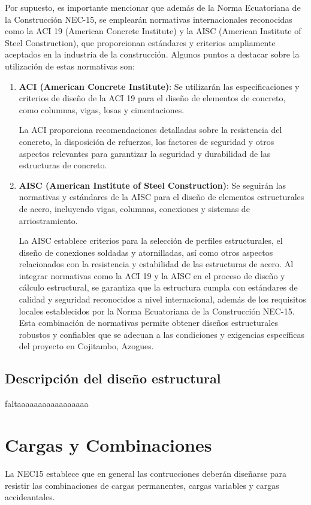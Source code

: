 \documentclass{report}
\begin{document}
Por supuesto, es importante mencionar que además de la Norma Ecuatoriana de la Construcción NEC-15, se emplearán normativas internacionales reconocidas como la ACI 19 (American Concrete Institute) y la AISC (American Institute of Steel Construction), que proporcionan estándares y criterios ampliamente aceptados en la industria de la construcción. Algunos puntos a destacar sobre la utilización de estas normativas son:
\begin{enumerate}
    \item  \textbf{ACI (American Concrete Institute)}: Se utilizarán las especificaciones y criterios de diseño de la ACI 19 para el diseño de elementos de concreto, como columnas, vigas, losas y cimentaciones. 
    
    La ACI  proporciona recomendaciones detalladas sobre la resistencia del concreto, la disposición de refuerzos, los factores de seguridad y otros aspectos relevantes para garantizar la seguridad y durabilidad de las estructuras de concreto.
    
    \item \textbf{AISC (American Institute of Steel Construction)}: Se seguirán las normativas y estándares de la AISC para el diseño de elementos estructurales de acero, incluyendo vigas, columnas, conexiones y sistemas de arriostramiento.
    
    La AISC establece criterios para la selección de perfiles estructurales, el diseño de conexiones soldadas y atornilladas, así como otros aspectos relacionados con la resistencia y estabilidad de las estructuras de acero.
    Al integrar normativas como la ACI 19 y la AISC en el proceso de diseño y cálculo estructural, se garantiza que la estructura cumpla con estándares de calidad y seguridad reconocidos a nivel internacional, además de los requisitos locales establecidos por la Norma Ecuatoriana de la Construcción NEC-15. Esta combinación de normativas permite obtener diseños estructurales robustos y confiables que se adecuan a las condiciones y exigencias específicas del proyecto en Cojitambo, Azogues.
\end{enumerate}

\section{Descripción del diseño estructural}
faltaaaaaaaaaaaaaaaaa

\chapter{Cargas y Combinaciones}
La NEC15 establece que en general las contrucciones deberán diseñarse para resistir las 
combinaciones de cargas permanentes, cargas variables y cargas accideantales.
\end{document}
